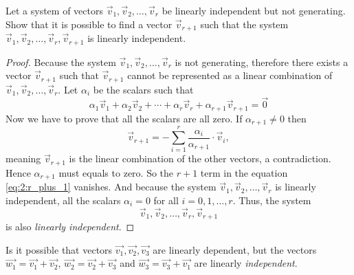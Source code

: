 \documentclass{article}
\begin{document}
\begin{exercise}
  Let a system of vectors $\vec{v}_1,\vec{v}_2,\dots, \vec{v}_r$
  be linearly independent but not generating. Show that it is possible 
  to find a vector $\vec{v}_{r+1}$ such that the system 
  $\vec{v}_1,\vec{v}_2, \dots, \vec{v}_r,\vec{v}_{r+1}$ is linearly 
  independent.
\end{exercise}
\begin{proof}
  Because the system $\vec{v}_1,\vec{v}_2,\dots, \vec{v}_r$ is not generating, 
  therefore there exists a vector $\vec{v}_{r+1}$ such that $\vec{v}_{r+1}$ 
  cannot be represented as a linear combination of $\vec{v}_1,\vec{v}_2,\dots, \vec{v}_r$.
  Let $\alpha_i$ be the scalars such that 
  \begin{equation}
    \label{eq:2:r_plus_1}
    \alpha_1\vec{v}_1+\alpha_2\vec{v}_2+\cdots+\alpha_r\vec{v}_r+\alpha_{r+1}\vec{v}_{r+1}=\vec{0}
  \end{equation}
  Now we have to prove that all the scalars are all zero.
  If $\alpha_{r+1}\neq 0$ then 
  \[
    \vec{v}_{r+1}=-\sum_{i=1}^{r}\frac{\alpha_i}{\alpha_{r+1}}\cdot\vec{v}_{i},
  \]
  meaning $\vec{v}_{r+1}$ is the linear combination of the other vectors, 
  a contradiction. Hence $\alpha_{r+1}$ must equals to zero. So
  the $r+1$ term in the equation \eqref{eq:2:r_plus_1} vanishes. And 
  because the system $\vec{v}_1,\vec{v}_2,\dots, \vec{v}_r$ is linearly independent, 
  all the scalars $\alpha_i=0$ for all $i=0,1,\dots,r$. Thus, the system
  \[
    \vec{v}_1,\vec{v}_2,\dots, \vec{v}_r, \vec{v}_{r+1}
  \]
  is also \emph{linearly independent}.
\end{proof}
\begin{exercise}
  Is it possible that vectors $\vec{v_1}, \vec{v_2}, \vec{v_3}$
  are linearly dependent, but the vectors $\vec{w_1}=\vec{v_1}+\vec{v_2}$,
  $\vec{w_2}=\vec{v_2}+\vec{v_3}$ and $\vec{w_3}=\vec{v_3}+\vec{v_1}$
  are linearly \emph{independent}.
\end{exercise}
\end{document}

